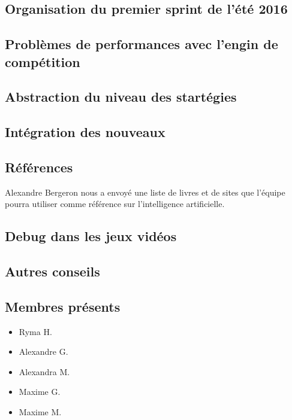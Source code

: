 \documentclass[12pt,letterpaper,twoside]{article}
\begin{document}
\subsection*{Organisation du premier sprint de l'été 2016}
\subsection*{Probl\`emes de performances avec l'engin de compétition}
\subsection*{Abstraction du niveau des startégies}
\subsection*{Intégration des nouveaux}
\subsection*{Références}
Alexandre Bergeron nous a envoyé une liste de livres et de sites que l'équipe pourra utiliser comme référence sur l'intelligence artificielle.
\subsection*{Debug dans les jeux vidéos}

\subsection*{Autres conseils}

\subsection*{Membres présents}
\begin{itemize}
\item Ryma H.
\item Alexandre G.
\item Alexandra M.
\item Maxime G.
\item Maxime M.
\end{itemize}
\end{document}
